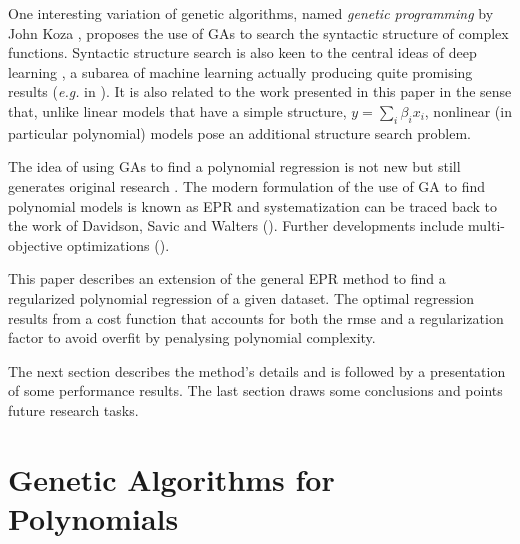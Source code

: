 \documentclass[preprint,authoryear,12pt]{elsarticle}
\begin{document}
One interesting variation of genetic algorithms, named \emph{genetic programming} by John Koza \citep{Koza:1992aa}, proposes the use of \acp{GA} to search the syntactic structure of complex functions. Syntactic structure search is also keen to the central ideas of deep learning \citep{Bengio:2009aa,Bengio:2013aa}, a subarea of machine learning actually producing quite promising results (\emph{e.g.} in \cite{Tarlow:2013fk}). It is also related to the work presented in this paper in the sense that, unlike linear models that have a simple structure, $y=\sum_i \beta_i x_i$, nonlinear (in particular polynomial) models pose an additional structure search problem.

The idea of using \acp{GA} to find a polynomial regression is not new \citep{Maertens:2006aa, Yu:2008aa, Wu:2009aa} but still generates original research \citep{Hofwing:2011aa,Cetisli:2011aa}. The modern formulation of the use of \ac{GA} to find polynomial models is known as \acf{EPR} and systematization can be traced back to the work of Davidson, Savic and Walters (\cite{Davidson:2003aa}). Further developments include multi-objective optimizations (\cite{Giustolisi:2009aa}). 

This paper describes an extension of the general \ac{EPR} method to find a regularized polynomial regression of a given dataset. The optimal regression results from a cost function that accounts for both the \ac{rmse} and a regularization factor to avoid overfit by penalysing polynomial complexity.



The next section describes the method's details and is followed by a presentation of some performance results. The last section draws some conclusions and points future research tasks.

\section{Genetic Algorithms for Polynomials}
\end{document}
